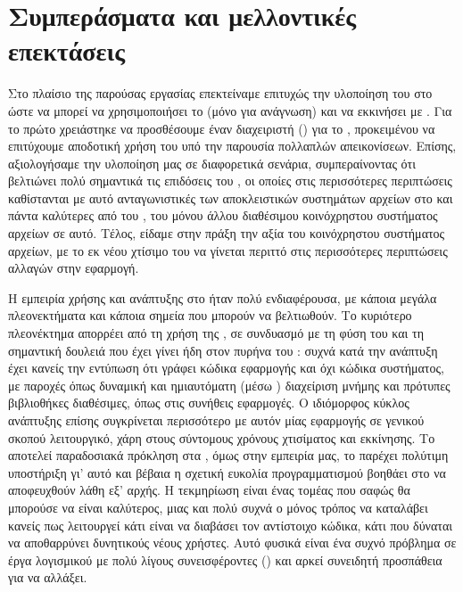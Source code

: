 \chapter{Συμπεράσματα και μελλοντικές επεκτάσεις}

Στο πλαίσιο της παρούσας εργασίας επεκτείναμε επιτυχώς την υλοποίηση του
\viofs{} στο \osv{} ώστε να μπορεί να χρησιμοποιήσει το  (μόνο
για ανάγνωση) και να εκκινήσει με \viofs{} . Για το πρώτο
χρειάστηκε να προσθέσουμε έναν διαχειριστή () για το , προκειμένου να επιτύχουμε αποδοτική χρήση του υπό την παρουσία
πολλαπλών απεικονίσεων. Επίσης, αξιολογήσαμε την υλοποίηση μας σε διαφορετικά
σενάρια, συμπεραίνοντας ότι βελτιώνει πολύ σημαντικά τις επιδόσεις του \viofs{},
οι οποίες στις περισσότερες περιπτώσεις καθίστανται με αυτό ανταγωνιστικές των
αποκλειστικών συστημάτων αρχείων στο \osv{} και πάντα καλύτερες από του
, του μόνου άλλου διαθέσιμου κοινόχρηστου συστήματος αρχείων σε αυτό.
Τέλος, είδαμε στην πράξη την αξία του κοινόχρηστου συστήματος αρχείων, με το εκ
νέου χτίσιμο του  να γίνεται περιττό στις περισσότερες περιπτώσεις
αλλαγών στην εφαρμογή.

Η εμπειρία χρήσης και ανάπτυξης στο \osv{} ήταν πολύ ενδιαφέρουσα, με κάποια
μεγάλα πλεονεκτήματα και κάποια σημεία που μπορούν να βελτιωθούν. Το κυριότερο
πλεονέκτημα απορρέει από τη χρήση της , σε συνδυασμό με τη φύση του
 και τη σημαντική δουλειά που έχει γίνει ήδη στον πυρήνα του
\osv{}: συχνά κατά την ανάπτυξη έχει κανείς την εντύπωση ότι γράφει κώδικα
εφαρμογής και όχι κώδικα συστήματος, με παροχές όπως δυναμική και ημιαυτόματη
(μέσω ) διαχείριση μνήμης και πρότυπες βιβλιοθήκες
διαθέσιμες, όπως στις συνήθεις εφαρμογές. Ο ιδιόμορφος κύκλος ανάπτυξης επίσης
συγκρίνεται περισσότερο με αυτόν μίας εφαρμογής σε γενικού σκοπού λειτουργικό,
χάρη στους σύντομους χρόνους χτισίματος και εκκίνησης. Το 
αποτελεί παραδοσιακά πρόκληση στα , όμως στην εμπειρία μας, το
\osv{} παρέχει πολύτιμη υποστήριξη γι' αυτό \cite{osv-wiki:debugging} και βέβαια
η σχετική ευκολία προγραμματισμού βοηθάει στο να αποφευχθούν λάθη εξ' αρχής. Η
τεκμηρίωση είναι ένας τομέας που σαφώς θα μπορούσε να είναι καλύτερος, μιας και
πολύ συχνά ο μόνος τρόπος να καταλάβει κανείς πως λειτουργεί κάτι είναι να
διαβάσει τον αντίστοιχο κώδικα, κάτι που δύναται να αποθαρρύνει δυνητικούς νέους
χρήστες. Αυτό φυσικά είναι ένα συχνό πρόβλημα σε έργα λογισμικού με πολύ λίγους
συνεισφέροντες () και αρκεί συνειδητή προσπάθεια για να
αλλάξει.

